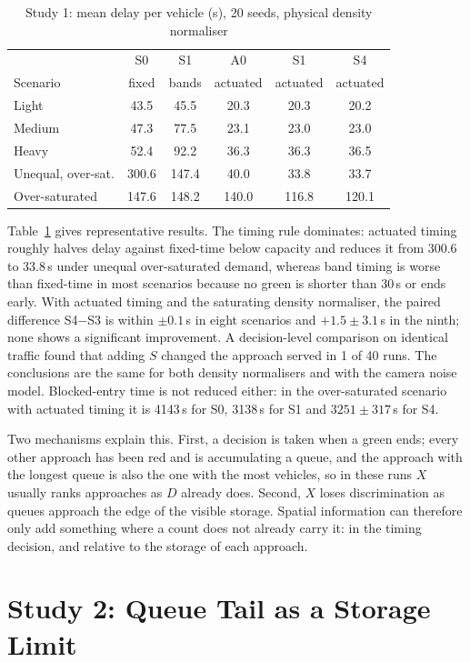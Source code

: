 \documentclass[conference]{IEEEtran}
\begin{document}
\begin{table}[t]
\caption{Study 1: mean delay per vehicle (s), 20 seeds, physical density normaliser}
\label{tab:study1}
\centering
\begin{tabular}{lccccc}
\toprule
 & S0 & S1 & A0 & S1 & S4\\
Scenario & fixed & bands & actuated & actuated & actuated\\
\midrule
Light & 43.5 & 45.5 & 20.3 & 20.3 & 20.2\\
Medium & 47.3 & 77.5 & 23.1 & 23.0 & 23.0\\
Heavy & 52.4 & 92.2 & 36.3 & 36.3 & 36.5\\
Unequal, over-sat. & 300.6 & 147.4 & 40.0 & 33.8 & 33.7\\
Over-saturated & 147.6 & 148.2 & 140.0 & 116.8 & 120.1\\
\bottomrule
\end{tabular}
\end{table}

Table~\ref{tab:study1} gives representative results. The timing rule dominates: actuated
timing roughly halves delay against fixed-time below capacity and reduces it from 300.6
to 33.8\,s under unequal over-saturated demand, whereas band timing is worse than
fixed-time in most scenarios because no green is shorter than 30\,s or ends early. With actuated timing and the saturating density normaliser, the paired difference S4$-$S3 is within $\pm0.1$\,s in eight scenarios and $+1.5\pm3.1$\,s in the ninth; none shows a significant improvement. A decision-level comparison on identical traffic found that adding $S$
changed the approach served in 1 of 40 runs. The conclusions are the same for both
density normalisers and with the camera noise model. Blocked-entry time is not reduced
either: in the over-saturated scenario with actuated timing it is 4143\,s for S0, 3138\,s for S1 and
$3251\pm317$\,s for S4.

Two mechanisms explain this. First, a decision is taken when a green ends; every other
approach has been red and is accumulating a queue, and the approach with the longest
queue is also the one with the most vehicles, so in these runs $X$ usually ranks approaches as $D$ already does. Second,
$X$ loses discrimination as queues approach the edge of the visible storage. Spatial information can
therefore only add something where a count does not already carry it: in the timing
decision, and relative to the storage of each approach.

\section{Study 2: Queue Tail as a Storage Limit}\label{sec:study2}
\end{document}
